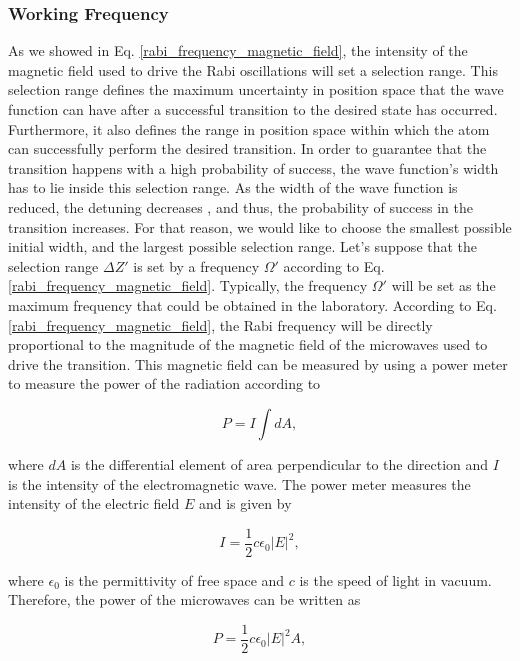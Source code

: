 \documentclass{article}
\begin{document}
\subsubsection{Working Frequency}
As we showed in Eq. \ref{rabi_frequency_magnetic_field}, the intensity of the magnetic field used to drive the Rabi oscillations will set a selection range. This selection range defines the maximum uncertainty in position space that the wave function can have after a successful transition to the desired state has occurred. Furthermore, it also defines the range in position space within which the atom can successfully perform the desired transition. In order to guarantee that the transition happens with a high probability of success, the wave function's width has to lie inside this selection range. As the width of the wave function is reduced, the detuning decreases , and thus, the probability of success in the transition increases. For that reason, we would like to choose the smallest possible initial width, and the largest possible selection range. Let's suppose that the selection range $\Delta Z'$ is set by a frequency $\Omega'$ according to Eq. \ref{rabi_frequency_magnetic_field}.
Typically, the frequency $\Omega'$ will be set as the maximum frequency that could be obtained in the laboratory. According to Eq. \ref{rabi_frequency_magnetic_field}, the Rabi frequency will be directly proportional to the magnitude of the magnetic field of the microwaves used to drive the transition. This magnetic field can be measured by using a power meter to measure the power of the radiation according to

\begin{equation}
    P = I \int dA,
\end{equation}

where $dA$ is the differential element of area perpendicular to the direction and $I$ is the intensity of the electromagnetic wave. The power meter measures the intensity of the electric field $E$ and is given by

\begin{equation}
    I = \frac{1}{2} c \epsilon_{0} |E|^{2},
\end{equation}

where $\epsilon_{0}$ is the permittivity of free space and $c$ is the speed of light in vacuum. Therefore, the power of the microwaves can be written as

\begin{equation}
    P = \frac{1}{2} c \epsilon_{0} |E|^{2} A,
\end{equation}
\end{document}
